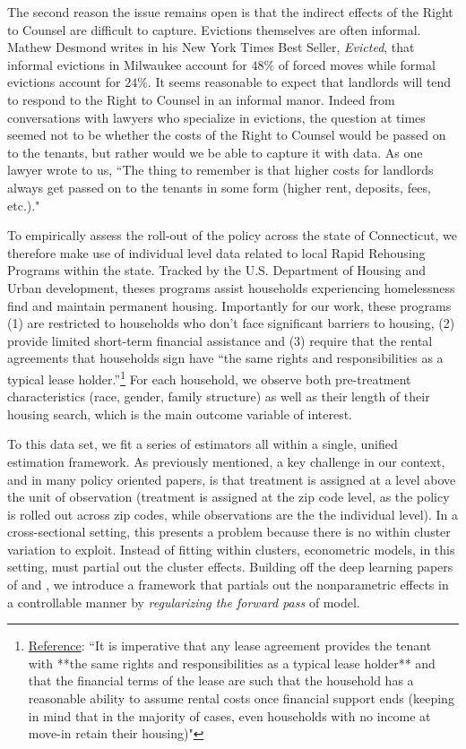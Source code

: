 \documentclass[a4paper,12pt]{article}
\begin{document}
The second reason the issue remains open is that the indirect effects of the Right to Counsel are difficult to capture. Evictions themselves are often informal. Mathew Desmond writes in his New York Times Best Seller, \textit{Evicted}, that informal evictions in Milwaukee account for $48\%$ of forced moves while formal evictions account for $24\%$. It seems reasonable to expect that landlords will tend to respond to the Right to Counsel in an informal manor. Indeed from conversations with lawyers who specialize in evictions, the question at times seemed not to be whether the costs of the Right to Counsel would be passed on to the tenants, but rather would we be able to capture it with data. As one lawyer wrote to us,  ``The thing to remember is that higher costs for landlords always get passed on to the tenants in some form (higher rent, deposits, fees, etc.)."\par 
To empirically assess the roll-out of the policy across the state of Connecticut, we therefore make use of individual level data related to local Rapid Rehousing Programs within the state. Tracked by the U.S. Department of Housing and Urban development, theses programs assist households experiencing homelessness find and maintain permanent housing. Importantly for our work, these programs (1) are restricted to households who don't face significant barriers to housing, (2) provide limited short-term financial assistance and (3) require that the rental agreements that households sign have ``the same rights and responsibilities as a typical lease holder.''\footnote{\href{thttps://endhomelessness.org/resource/rapid-re-housing-a-history-and-core-components/}{Reference}: ``It is imperative that any lease agreement provides the tenant with **the same rights and responsibilities as a typical lease holder** and that the financial terms of the lease are such that the household has a reasonable ability to assume rental costs once financial support ends (keeping in mind that in the majority of cases, even households with no income at move-in retain their housing)"} For each household, we observe both pre-treatment characteristics (race, gender, family structure) as well as their length of their housing search, which is the main outcome variable of interest. \par 
To this data set, we fit a series of estimators all within a single, unified estimation framework. As previously mentioned, a key challenge in our context, and in many policy oriented papers, is that treatment is assigned at a level above the unit of observation (treatment is assigned at the zip code level, as the policy is rolled out across zip codes, while observations are the the individual level). In a cross-sectional setting, this presents a problem because there is no within cluster variation to exploit. Instead of fitting within clusters, econometric models, in this setting, must partial out the cluster effects. Building off the deep learning papers of \cite{finn2017model} and \cite{kelly2020learning}, we introduce a framework that partials out the nonparametric effects in a controllable manner by \textit{regularizing the forward pass} of model. \par 
\end{document}
